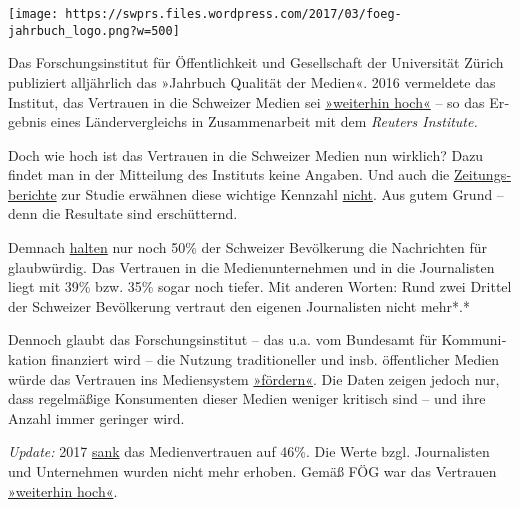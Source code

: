 \texttt{[image: https://swprs.files.wordpress.com/2017/03/foeg-jahrbuch\_logo.png?w=500]}

Das Forschungs­institut für Öf­fent­lich­­keit und Gesell­schaft der
Uni­ver­sität Zürich publi­ziert all­jähr­lich das »Jahr­buch Qualität
der Medien«. 2016 ver­mel­dete das In­sti­tut, das Ver­trau­en in die
Schwei­zer Me­dien sei
\href{http://www.foeg.uzh.ch/dam/jcr:7234c6d3-1f09-4d36-b6ab-f14e659d046e/Medienmitteilung_JB_2016_dt.pdf}{»weiter­hin
hoch«} -- so das Er­geb­nis eines Länder­ver­gleichs in
Zu­sam­men­ar­beit mit dem \emph{\emph{Reu­ters Insti­tute.}}

Doch wie hoch ist das Vertrauen in die Schweizer Medien nun wirklich?
Dazu findet man in der Mit­tei­lung des Instituts keine An­ga­ben. Und
auch die
\href{http://www.tagesanzeiger.ch/schweiz/standard/Diese-Menschen-sind-anfaellig-fuer-Populisten/story/23804017}{Zei­tungs­be­richte}
zur Studie er­wäh­nen diese wich­tige Kenn­zahl
\href{http://www.nzz.ch/schweiz/analyse-zum-medienvertrauen-oeffentliche-medien-staerken-auch-die-privaten-ld.128965}{nicht}.
Aus gutem Grund -- denn die Resultate sind er­schüt­ternd.

Demnach
\href{http://media.digitalnewsreport.org/wp-content/uploads/2018/11/Digital-News-Report-2016.pdf\#page=60}{halten}
nur noch 50\% der Schwei­zer Be­völ­ke­rung die Nach­rich­ten für
glaub­würdig. Das Ver­trauen in die Medien­unter­nehmen und in die
Jour­na­listen liegt mit 39\% bzw. 35\% sogar noch tiefer. Mit anderen
Worten: Rund zwei Drittel der Schweizer Be­völ­ke­rung ver­traut den
ei­ge­nen Jour­na­listen nicht mehr*.*

Dennoch glaubt das For­schungs­in­sti­tut -- das u.a. vom Bundes­amt für
Kom­mu­ni­ka­tion finanziert wird -- die Nutzung tra­di­tio­neller und
ins­b. öffent­licher Medien würde das Ver­trauen ins Medien­system
\href{http://www.foeg.uzh.ch/dam/jcr:7234c6d3-1f09-4d36-b6ab-f14e659d046e/Medienmitteilung_JB_2016_dt.pdf}{»för­dern«}.
Die Da­ten zei­gen je­doch nur, dass regel­mäßige Kon­su­menten die­ser
Me­dien we­ni­ger kri­tisch sind -- und ihre An­zahl immer ge­ringer
wird.

\emph{Update:} 2017
\href{http://www.digitalnewsreport.org/survey/2017/switzerland-2017/}{sank}
das Medienvertrauen auf 46\%. Die Werte bzgl. Journalisten und
Unter­neh­men wurden nicht mehr erhoben. Gemäß FÖG war das Vertrauen
\href{http://www.foeg.uzh.ch/dam/jcr:0d0e5a10-27be-4e97-b264-b2cf7de96bbd/Broschur_Jahrbuch_foeg_deutsch_2017_ohne_Sperrvermerk.pdf}{»weiterhin
hoch«}.

